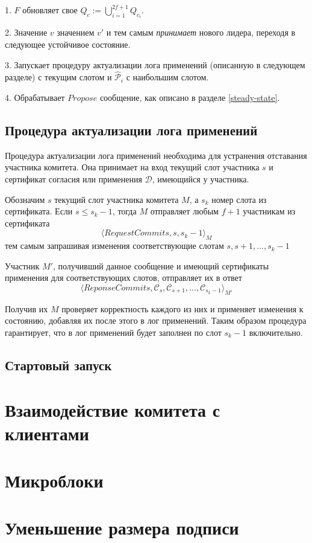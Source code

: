 1. $F$ обновляет свое $Q_c := \bigcup\limits_{i=1}^{2f+1} Q_{c_i}$.

2. Значение $v$ значением $v'$ и тем самым \textit{принимает} нового лидера, переходя в следующее устойчивое состояние.

3. Запускает процедуру актуализации лога применений (описанную в следующем разделе) с текущим слотом и $\hat{\mathcal{P}}_i$ с наибольшим слотом.

4. Обрабатывает $Propose$ сообщение, как описано в разделе \ref{steady-state}.

\subsection{Процедура актуализации лога применений} \label{act_log}
Процедура актуализации лога применений необходима для устранения отставания участника комитета.
Она принимает на вход текущий слот участника $s$ и сертификат согласия или применения $\mathcal{D}$, имеющийся у участника.

Обозначим $s$ текущий слот участника комитета $M$, а $s_k$ номер слота из сертификата. Если $s \le s_k-1$, тогда $M$ отправляет любым $f+1$ участникам из сертификата 
\[ \langle RequestCommits, s, s_k-1 \rangle_M \]
тем самым запрашивая изменения соответствующие слотам $s, s+1,..., s_k-1$

Участник $M'$, получивший данное сообщение и имеющий сертификаты применения для соответствующих слотов, отправляет их в ответ
\[ \langle ReponseCommits, \mathcal{C}_s, \mathcal{C}_{s+1},...,\mathcal{C}_{s_k-1} \rangle_{M'} \]

Получив их $M$ проверяет корректность каждого из них и применяет изменения к состоянию, добавляя их после этого в лог применений. Таким образом процедура гарантирует, что в лог применений будет заполнен по слот $s_k-1$ включительно.

\subsection{Стартовый запуск}

\section{Взаимодействие комитета с клиентами}

\section{Микроблоки}

\section{Уменьшение размера подписи}


